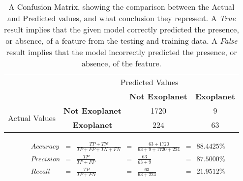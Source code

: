 
    \renewcommand{\arraystretch}{2}
    \renewcommand{\tabcolsep}{20.25pt}
    \begin{table}[ht]
    \begin{tabular}{cccc}
     & \multicolumn{3}{c}{Predicted Values} \\ \cline{3-4}
     & \multicolumn{1}{c|}{} & \multicolumn{1}{c|}{\textbf{Not Exoplanet}} & \multicolumn{1}{c|}{\textbf{Exoplanet}} \\ \cline{2-4}
    \multicolumn{1}{c|}{\multirow{2}{2.0cm}{Actual Values}} & \multicolumn{1}{c|}{\textbf{Not Exoplanet}} & \multicolumn{1}{c|}{1720} & \multicolumn{1}{c|}{9} \\ \cline{2-4}
    \multicolumn{1}{c|}{} & \multicolumn{1}{c|}{\textbf{Exoplanet}} & \multicolumn{1}{c|}{224} & \multicolumn{1}{c|}{63} \\ \cline{2-4}
    \end{tabular}
    \caption{A Confusion Matrix, showing the comparison between the Actual and Predicted values, and what conclusion they represent. A \emph{True} result implies that the given model correctly predicted the presence, or absence, of a feature from the testing and training data. A \emph{False} result implies that the model incorrectly predicted the presence, or absence, of the feature.}
    \label{tab:sklearn-RNDTREEconfusionmatrix}
    \end{table}

    \label{eq:precisionsklearn-RNDTREE}
    \begin{align*}
        Accuracy &= &\frac{TP + TN}{TP + FP + TN + FN} &= &\frac{63 + 1720}{63 + 9 + 1720 + 224} &= & 88.4425\% \\
        Precision &= &\frac{TP}{TP + FP} &= &\frac{63}{63 + 9} &= & 87.5000\% \\
        Recall &= &\frac{TP}{TP + FN} &= &\frac{63}{63 + 224} &= & 21.9512\% \\
    \end{align*}

    \renewcommand{\arraystretch}{1}
    \renewcommand{\tabcolsep}{5.25pt}
    